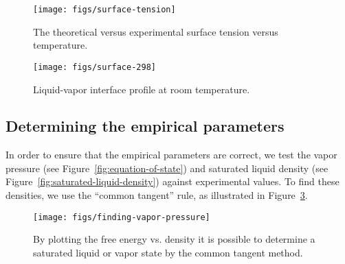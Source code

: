 \documentclass[letterpaper,twocolumn,amsmath,amssymb,prb]{revtex4}
\begin{document}
\begin{figure}
\begin{center}
\texttt{[image: figs/surface-tension]}
\end{center}
\caption{The theoretical versus experimental surface tension
  versus temperature.  }
\label{fig:surface-tension}
\end{figure}

\begin{figure}
\begin{center}
\texttt{[image: figs/surface-298]}
\end{center}
\caption{Liquid-vapor interface profile at room temperature.  }
\label{fig:liquid-vapor-profile}
\end{figure}

\subsection{Determining the empirical parameters}\label{sec:empirical}

In order to ensure that the empirical parameters are correct, we test
the vapor pressure (see Figure~\ref{fig:equation-of-state}) and
saturated liquid density (see
Figure~\ref{fig:saturated-liquid-density}) against experimental
values.  To find these densities, we use the ``common tangent'' rule,
as illustrated in Figure~\ref{fig:homogeneous}.
\begin{figure}
\begin{center}
\texttt{[image: figs/finding-vapor-pressure]}
\end{center}
\caption{By plotting the free energy vs. density it is possible to
  determine a saturated liquid or vapor state by the common tangent
  method.  }
\label{fig:homogeneous}
\end{figure}
\end{document}
